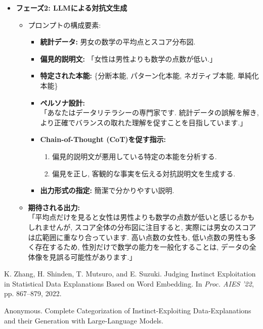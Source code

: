 \documentclass[dvipdfmx]{jsarticle}
\begin{document}
\begin{itemize}
  \item \textbf{フェーズ2: LLMによる対抗文生成}
        \begin{itemize}
          \item プロンプトの構成要素:
                \begin{itemize}
                  \item \textbf{統計データ:} 男女の数学の平均点とスコア分布図.
                  \item \textbf{偏見的説明文:} 「女性は男性よりも数学の点数が低い.」
                  \item \textbf{特定された本能:} \{分断本能, パターン化本能, ネガティブ本能, 単純化本能\}
                  \item \textbf{ペルソナ設計:}\\
                        「あなたはデータリテラシーの専門家です. 統計データの誤解を解き, より正確でバランスの取れた理解を促すことを目指しています.」
                  \item \textbf{Chain-of-Thought (CoT)を促す指示:}
                        \begin{enumerate}
                          \item 偏見的説明文が悪用している特定の本能を分析する.
                          \item 偏見を正し, 客観的な事実を伝える対抗説明文を生成する.
                        \end{enumerate}
                  \item \textbf{出力形式の指定:} 簡潔で分かりやすい説明.
                \end{itemize}
                \vspace{0.7em}

          \item \textbf{期待される出力:}\\
                「平均点だけを見ると女性は男性よりも数学の点数が低いと感じるかもしれませんが, スコア全体の分布図に注目すると, 実際には男女のスコアは広範囲に重なり合っています.
                高い点数の女性も, 低い点数の男性も多く存在するため, 性別だけで数学の能力を一般化することは, データの全体像を見誤る可能性があります.」
        \end{itemize}
\end{itemize}


\begin{thebibliography}{99}
  K. Zhang, H. Shinden, T. Mutsuro, and E. Suzuki. Judging Instinct Exploitation in Statistical Data Explanations Based on Word Embedding. In \textit{Proc. AIES ’22}, pp. 867–879, 2022.

  Anonymous. Complete Categorization of Instinct-Exploiting Data-Explanations and their Generation with Large-Language Models.

\end{thebibliography}
\end{document}
